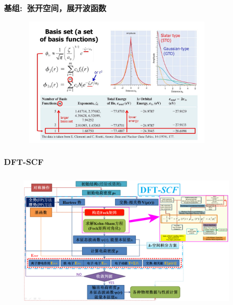 {\frame
{
	\frametitle{基组:~张开空间，展开波函数}
\begin{figure}[h!]
	\vspace{-5pt}
\centering
\includegraphics[height=2.6in,width=4.01in,viewport=0 0 780 550,clip]{Figures/Basis-set-STO-GTO.jpg}
\caption{\fontsize{5.5pt}{4.2pt}}%
\label{Basic-set:STO-GTO}
\end{figure}
}

\frame
{
	\frametitle{\textrm{DFT-SCF}}
\begin{figure}[h!]
\centering
\vspace*{-0.25in}
\hspace*{-0.80in}
\includegraphics[height=2.80in,width=4.95in,viewport=5 3 1490 870,clip]{Figures/DFT-SCF_2.png}
\label{DFT-SCF-2}
\end{figure}
}

}
